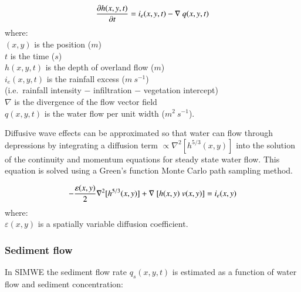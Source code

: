 \documentclass[final,3p,times,twocolumn]{elsarticle}
\begin{document}
\begin{equation}
\label{eq:water}
{\partial h(x,y,t) \over \partial t} =
 i_e(x,y,t) - \nabla ~ q(x,y,t)
\end{equation}
%
{\small
\noindent
where: \\
\noindent
\hspace*{0.5em} $(x,y)$ is the position ($m$)\\
\hspace*{0.5em} $t$ is the time ($s$) \\
\hspace*{0.5em} $h(x,y,t)$ is the depth of overland flow ($m$)\\
\hspace*{0.5em} $i_e(x,y,t)$ is the rainfall excess ($m~s^{-1}$) \\
\hspace*{0.5em} (i.e.~rainfall intensity $-$ infiltration $-$ vegetation intercept)\\
\hspace*{0.5em} $\nabla$ is the divergence of the flow vector field\\
\hspace*{0.5em} $q(x,y,t)$ is the water flow per unit width ($m^2~s^{-1}$). \\
}

Diffusive wave effects can be approximated
so that water can flow through depressions 
by integrating a diffusion term $ \propto \nabla^2 [h^{5/3}(x,y)]$ 
into the solution of the continuity and momentum equations 
for steady state water flow.
This equation is solved using a 
Green's function Monte Carlo path sampling method. 

\begin{equation}
\label{eq:difwater}
-{\varepsilon(x,y)\over 2 }\nabla^2 [h^{5/3}(x,y)]
+\nabla ~ [ h(x,y)~v(x,y)] = i_e(x,y)
\end{equation}
%
{\small
\noindent
 where: \\
 \noindent
 \hspace*{0.5em} $\varepsilon(x,y)$ is a spatially variable diffusion coefficient. \\
}

\subsubsection{Sediment flow}
In SIMWE the sediment flow rate $q_s(x,y,t)$ is estimated 
as a function of water flow and sediment concentration:
\end{document}
